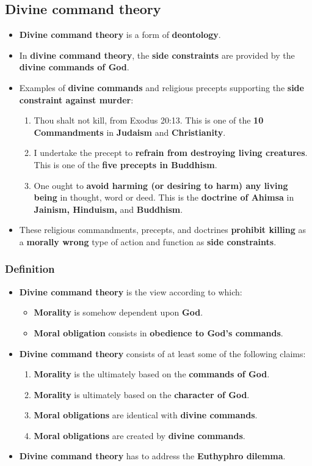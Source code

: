 \documentclass[11pt]{article}
\begin{document}
\subsection{Divine command theory}
\label{sec:org7d98730}
\begin{itemize}
\item \textbf{Divine command theory} is a form of \textbf{deontology}.
\item In \textbf{divine command theory}, the \textbf{side constraints} are provided by the \textbf{divine commands of God}.
\item Examples of \textbf{divine commands} and religious precepts supporting the \textbf{side constraint against murder}:
\begin{enumerate}
\item Thou shalt not kill, from Exodus 20:13. This is one of the \textbf{10 Commandments} in \textbf{Judaism} and \textbf{Christianity}.
\item I undertake the precept to \textbf{refrain from destroying living creatures}. This is one of the \textbf{five precepts in Buddhism}.
\item One ought to \textbf{avoid harming (or desiring to harm) any living being} in thought, word or deed. This is the \textbf{doctrine of Ahimsa} in \textbf{Jainism, Hinduism,} and \textbf{Buddhism}.
\end{enumerate}
\item These religious commandments, precepts, and doctrines \textbf{prohibit killing} as a \textbf{morally wrong} type of action and function as \textbf{side constraints}.
\end{itemize}
\subsubsection{Definition}
\label{sec:org7238470}
\begin{itemize}
\item \textbf{Divine command theory} is the view according to which:
\begin{itemize}
\item \textbf{Morality} is somehow dependent upon \textbf{God}.
\item \textbf{Moral obligation} consists in \textbf{obedience to God's commands}.
\end{itemize}
\item \textbf{Divine command theory} consists of at least some of the following claims:
\begin{enumerate}
\item \textbf{Morality} is the ultimately based on the \textbf{commands of God}.
\item \textbf{Morality} is ultimately based on the \textbf{character of God}.
\item \textbf{Moral obligations} are identical with \textbf{divine commands}.
\item \textbf{Moral obligations} are created by \textbf{divine commands}.
\end{enumerate}
\item \textbf{Divine command theory} has to address the \textbf{Euthyphro dilemma}.
\end{itemize}
\end{document}
